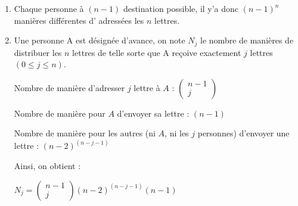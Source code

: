 \documentclass[a4paper,10pt]{article}
\renewcommand{\leq}{\leqslant}
\begin{document}
	\begin{enumerate}
	\item
	Chaque personne à $(n-1)$ destination possible, il y'a donc $(n-1)^n$ manières différentes d' adressées les $n$ lettres.
	\item Une personne A est désignée d'avance, on note $N_j$ le nombre de manières de distribuer les $n$ lettres de telle sorte que A reçoive exactement $j $ lettres $(0\leq j \leq n)$. 
	
	Nombre de manière d'adresser $j$ lettre à $A$ : 
		$\left(\begin{array}{c} n-1 \\ j \end{array} \right)$
		
	Nombre de manière pour $A$ d'envoyer sa lettre : $(n-1)$
	
	Nombre de manière pour les autres (ni $A$, ni les $j$ personnes) d'envoyer une lettre : $(n-2)^{(n-j-1)}$
	
	Ainsi, on obtient :
	\begin{center}
		$N_j = \left(\begin{array}{c} n-1 \\ j \end{array} \right)(n-2)^{(n-j-1)}(n-1)$
	 \end{center}
	\end{enumerate}
	
\end{document}
